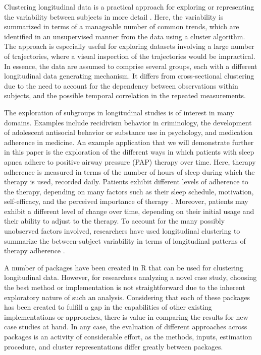 Clustering longitudinal data is a practical approach for exploring or representing the variability between subjects in more detail \citep{hamaker2012researchers}. Here, the variability is summarized in terms of a manageable number of common trends, which are identified in an unsupervised manner from the data using a cluster algorithm. The approach is especially useful for exploring datasets involving a large number of trajectories, where a visual inspection of the trajectories would be impractical. In essence, the data are assumed to comprise several groups, each with a different longitudinal data generating mechanism. It differs from cross-sectional clustering due to the need to account for the dependency between observations within subjects, and the possible temporal correlation in the repeated measurements.

The exploration of subgroups in longitudinal studies is of interest in many domains. Examples include recidivism behavior in criminology, the development of adolescent antisocial behavior or substance use in psychology, and medication adherence in medicine. An example application that we will demonstrate further in this paper is the exploration of the different ways in which patients with sleep apnea adhere to positive airway pressure (PAP) therapy over time. Here, therapy adherence is measured in terms of the number of hours of sleep during which the therapy is used, recorded daily. Patients exhibit different levels of adherence to the therapy, depending on many factors such as their sleep schedule, motivation, self-efficacy, and the perceived importance of therapy \citep{cayanan2019review}. Moreover, patients may exhibit a different level of change over time, depending on their initial usage and their ability to adjust to the therapy. To account for the many possibly unobserved factors involved, researchers have used longitudinal clustering to summarize the between-subject variability in terms of longitudinal patterns of therapy adherence \citep{babbin2015identifying, denteuling2021latent, yi2022identifying}.

A number of packages have been created in R \citep{rcoreteam2021r} that can be used for clustering longitudinal data. However, for researchers analyzing a novel case study, choosing the best method or implementation is not straightforward due to the inherent exploratory nature of such an analysis. Considering that each of these packages has been created to fulfill a gap in the capabilities of other existing implementations or approaches, there is value in comparing the results for new case studies at hand. In any case, the evaluation of different approaches across packages is an activity of considerable effort, as the methods, inputs, estimation procedure, and cluster representations differ greatly between packages.

